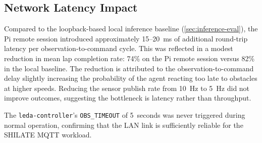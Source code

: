 \subsection{Network Latency Impact}
\label{sec:pi-latency}

Compared to the loopback-based local inference baseline
(\cref{sec:inference-eval}), the Pi remote session introduced
approximately 15--20~ms of additional round-trip latency per
observation-to-command cycle. This was reflected in a modest reduction
in mean lap completion rate: 74\% on the Pi remote session versus 82\%
in the local baseline. The reduction is attributed to the
observation-to-command delay slightly increasing the probability of the
agent reacting too late to obstacles at higher speeds. Reducing the
sensor publish rate from 10~Hz to 5~Hz did not improve outcomes,
suggesting the bottleneck is latency rather than throughput.

The \texttt{leda-controller}'s \texttt{OBS\_TIMEOUT} of 5~seconds was
never triggered during normal operation, confirming that the LAN link is
sufficiently reliable for the SHILATE MQTT workload.

